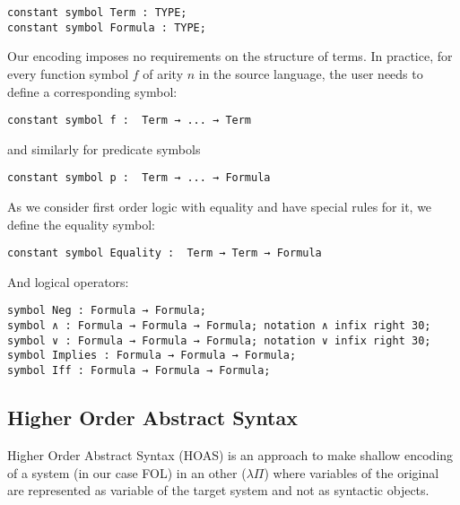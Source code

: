\documentclass{article}
\begin{document}
	\begin{lstlisting}[language=Dialekto]
constant symbol Term : TYPE;
constant symbol Formula : TYPE;
	\end{lstlisting}
	Our encoding imposes no requirements on the structure of terms. In practice,  for every function symbol $f$ of arity $n$ in the source language, the user needs to define a corresponding symbol:
	\begin{lstlisting}[language=Dialekto]
constant symbol f :  Term → ... → Term
	\end{lstlisting}
	and similarly for predicate symbols
	\begin{lstlisting}[language=Dialekto]
constant symbol p :  Term → ... → Formula
	\end{lstlisting}
	As we consider first order logic with equality and have special rules for it, we define the equality symbol:
	\begin{lstlisting}[language=Dialekto]
constant symbol Equality :  Term → Term → Formula
	\end{lstlisting}
	And logical operators:
	\begin{lstlisting}[language=Dialekto]
symbol Neg : Formula → Formula;
symbol ∧ : Formula → Formula → Formula; notation ∧ infix right 30;
symbol ∨ : Formula → Formula → Formula; notation ∨ infix right 30;
symbol Implies : Formula → Formula → Formula;
symbol Iff : Formula → Formula → Formula;
\end{lstlisting}
	\subsection{Higher Order Abstract Syntax}
	Higher Order Abstract Syntax (HOAS) is an approach to make shallow encoding of a system (in our case FOL) in an other ($\lambda \Pi$) where variables of the original are represented as variable of the target system and not as syntactic objects.
	
\end{document}
